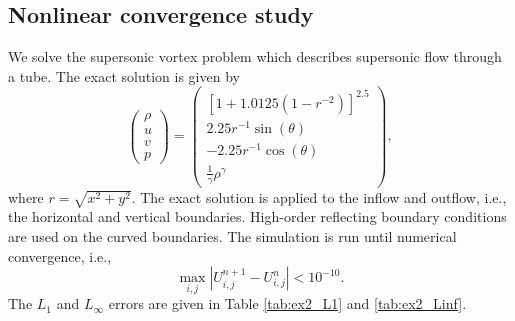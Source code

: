 \subsection{Nonlinear convergence study}
We solve the supersonic vortex problem which describes supersonic flow through a tube.  The exact solution is given by
$$
\begin{pmatrix}
\rho\\
u \\
v \\
p
\end{pmatrix} = \begin{pmatrix}
[1 + 1.0125(1-r^{-2})]^{2.5}\\
2.25r^{-1}\sin(\theta)\\
-2.25r^{-1}\cos(\theta)\\
\frac{1}{\gamma}\rho^{\gamma}
\end{pmatrix},
$$
where $r = \sqrt{x^2+y^2}$.  The exact solution is applied to the inflow and outflow, i.e., the horizontal and vertical boundaries.  High-order reflecting boundary conditions are used on the curved boundaries.  The simulation is run until numerical convergence, i.e., 
$$
\max_{i,j}|U^{n+1}_{i,j}-U^{n}_{i,j}| < 10^{-10}.
$$
The $L_1$ and $L_\infty$ errors are given in Table \ref{tab:ex2_L1} and \ref{tab:ex2_Linf}.


